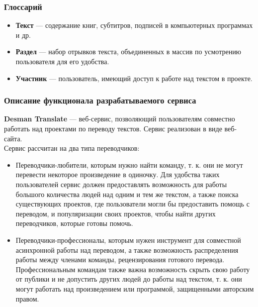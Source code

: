 \documentclass[a4paper,12pt]{article}
\begin{document}
\subsubsection{Глоссарий}
\begin{itemize}
\item \textbf{Текст} — содержание книг, субтитров, подписей в компьютерных программах и др.
\item \textbf{Раздел} — набор отрывков текста, объединенных в массив по усмотрению пользователя для его удобства.
\item \textbf{Участник} — пользователь, имеющий доступ к работе над текстом в проекте.
\end{itemize}

\subsubsection{Описание функционала разрабатываемого сервиса}
\textbf{Desman Translate} — веб-сервис, позволяющий пользователям совместно работать над проектами по переводу текстов. Сервис реализован в виде веб-сайта.\\

Сервис рассчитан на два типа переводчиков:
\begin{itemize}
\item Переводчики-любители, которым нужно найти команду, т. к. они не могут перевести некоторое произведение в одиночку. Для удобства таких пользователей сервис должен предоставлять возможность для работы большого количества людей над одним и тем же текстом, а также поиска существующих проектов, где пользователи могли бы предоставить помощь с переводом, и популяризации своих проектов, чтобы найти других переводчиков, которые готовы помочь.
\item Переводчики-профессионалы, которым нужен инструмент для совместной асинхронной работы над переводом, а также возможность распределения работы между членами команды, рецензирования готового перевода. Профессиональным командам также важна возможность скрыть свою работу от публики и не допустить других людей до работы над текстом, т. к. они могут работать над произведением или программой, защищенными авторским правом.
\end{itemize}
\end{document}
